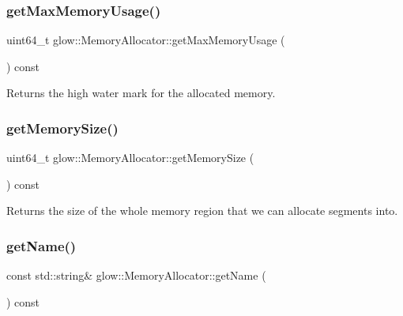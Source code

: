 \subsubsection{\texorpdfstring{get\+Max\+Memory\+Usage()}{getMaxMemoryUsage()}}
{\footnotesize\ttfamily uint64\+\_\+t glow\+::\+Memory\+Allocator\+::get\+Max\+Memory\+Usage (\begin{DoxyParamCaption}{ }\end{DoxyParamCaption}) const\hspace{0.3cm}{\ttfamily [inline]}}

\begin{DoxyReturn}{Returns}
the high water mark for the allocated memory. 
\end{DoxyReturn}
\mbox{\label{classglow_1_1_memory_allocator_a8d2b8991817b453831e7aadd67d139ea}} 
\subsubsection{\texorpdfstring{get\+Memory\+Size()}{getMemorySize()}}
{\footnotesize\ttfamily uint64\+\_\+t glow\+::\+Memory\+Allocator\+::get\+Memory\+Size (\begin{DoxyParamCaption}{ }\end{DoxyParamCaption}) const\hspace{0.3cm}{\ttfamily [inline]}}

\begin{DoxyReturn}{Returns}
the size of the whole memory region that we can allocate segments into. 
\end{DoxyReturn}
\mbox{\label{classglow_1_1_memory_allocator_a7c51c4cd7710dd6b827034211db38e17}} 
\subsubsection{\texorpdfstring{get\+Name()}{getName()}}
{\footnotesize\ttfamily const std\+::string\& glow\+::\+Memory\+Allocator\+::get\+Name (\begin{DoxyParamCaption}{ }\end{DoxyParamCaption}) const\hspace{0.3cm}{\ttfamily [inline]}}

